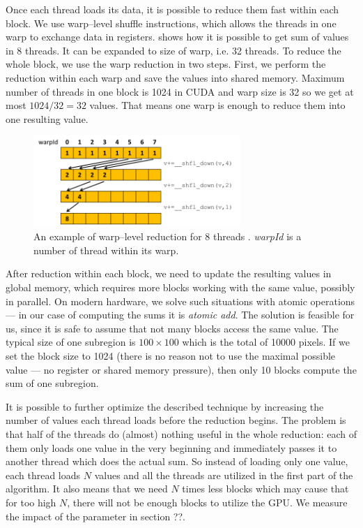 Once each thread loads its data, it is possible to reduce them fast within each block. We use warp--level shuffle instructions, which allows the threads in one warp to exchange data in registers.  shows how it is possible to get sum of values in 8 threads. It can be expanded to size of warp, i.e. 32 threads. To reduce the whole block, we use the warp reduction in two steps. First, we perform the reduction within each warp and save the values into shared memory. Maximum number of threads in one block is 1024 in CUDA and warp size is 32 so we get at most $1024/32 = 32$ values. That means one warp is enough to reduce them into one resulting value.

\begin{figure}
	\centering
	\includegraphics[width=0.7\textwidth]{img/warp_reduce}
	\caption{An example of warp--level reduction for 8 threads \cite{parallelReduction}. \emph{warpId} is a number of thread within its warp.}
	\label{warp_reduce}
\end{figure}

After reduction within each block, we need to update the resulting values in global memory, which requires more blocks working with the same value, possibly in parallel. On modern hardware, we solve such situations with atomic operations --- in our case of computing the sums it is \emph{atomic add}. The solution is feasible for us, since it is safe to assume that not many blocks access the same value. The typical size of one subregion is $100 \times 100$ which is the total of 10000 pixels. If we set the block size to 1024 (there is no reason not to use the maximal possible value --- no register or shared memory pressure), then only 10 blocks compute the sum of one subregion.

It is possible to further optimize the described technique by increasing the number of values each thread loads before the reduction begins. The problem is that half of the threads do (almost) nothing useful in the whole reduction: each of them only loads one value in the very beginning and immediately passes it to another thread which does the actual sum. So instead of loading only one value, each thread loads $N$ values and all the threads are utilized in the first part of the algorithm. It also means that we need $N$ times less blocks which may cause that for too high $N$, there will not be enough blocks to utilize the GPU. We measure the impact of the parameter in section ??.

